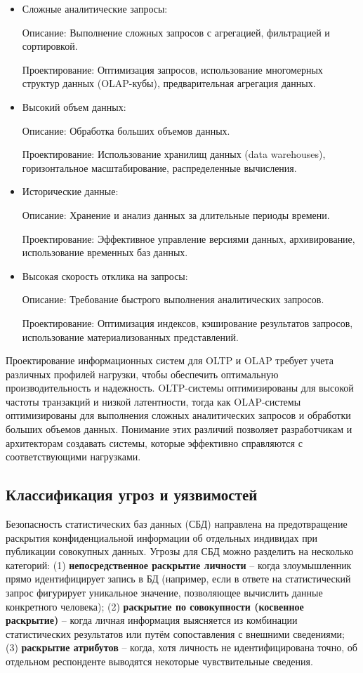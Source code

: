 \begin{itemize}
	
	\item Сложные аналитические запросы:

	Описание: Выполнение сложных запросов с агрегацией, фильтрацией и сортировкой.
	
	Проектирование: Оптимизация запросов, использование многомерных структур данных (OLAP-кубы), предварительная агрегация данных.
	
	\item Высокий объем данных:

	Описание: Обработка больших объемов данных.
	
	Проектирование: Использование хранилищ данных (data warehouses), горизонтальное масштабирование, распределенные вычисления.
	
	\item Исторические данные:

	Описание: Хранение и анализ данных за длительные периоды времени.
	
	Проектирование: Эффективное управление версиями данных, архивирование, использование временных баз данных.
	
	\item Высокая скорость отклика на запросы:

	Описание: Требование быстрого выполнения аналитических запросов.
	
	Проектирование: Оптимизация индексов, кэширование результатов запросов, использование материализованных представлений.
\end{itemize}

Проектирование информационных систем для OLTP и OLAP требует учета различных профилей нагрузки, чтобы обеспечить оптимальную производительность и надежность. OLTP-системы оптимизированы для высокой частоты транзакций и низкой латентности, тогда как OLAP-системы оптимизированы для выполнения сложных аналитических запросов и обработки больших объемов данных. Понимание этих различий позволяет разработчикам и архитекторам создавать системы, которые эффективно справляются с соответствующими нагрузками.

\subsection{Классификация угроз и уязвимостей}
Безопасность статистических баз данных (СБД) направлена на предотвращение раскрытия
конфиденциальной информации об отдельных индивидах при публикации совокупных данных.
Угрозы для СБД можно разделить на несколько категорий: (1) \textbf{непосредственное
раскрытие личности} – когда злоумышленник прямо идентифицирует запись в БД (например, если
в ответе на статистический запрос фигурирует уникальное значение, позволяющее вычислить
данные конкретного человека); (2) \textbf{раскрытие по совокупности (косвенное раскрытие)}
– когда личная информация выясняется из комбинации статистических результатов или путём
сопоставления с внешними сведениями; (3) \textbf{раскрытие атрибутов} – когда, хотя
личность не идентифицирована точно, об отдельном респонденте выводятся некоторые
чувствительные сведения.

